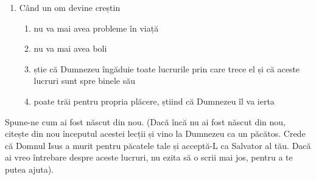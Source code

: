 \begin{enumerate}[itemsep=19pt]
	\item Când un om devine creștin
		\begin{enumerate}
			\item nu va mai avea probleme în viață
			\item nu va mai avea boli
			\item știe că Dumnezeu îngăduie toate lucrurile prin care trece el și că aceste lucruri sunt spre binele său
			\item poate trăi pentru propria plăcere, știind că Dumnezeu îl va ierta
			\liniescurta
		\end{enumerate}
\end{enumerate}

\spatiuv
{} Spune-ne cum ai fost născut din nou. (Dacă încă nu ai fost născut din nou, citește din nou începutul acestei lecții și vino la Dumnezeu ca un păcătos. Crede că Domnul Isus a murit pentru păcatele tale și acceptă-L ca Salvator al tău. Dacă ai vreo întrebare despre aceste lucruri, nu ezita să o scrii mai jos, pentru a te putea ajuta).
\\
\\
\\
\parereata